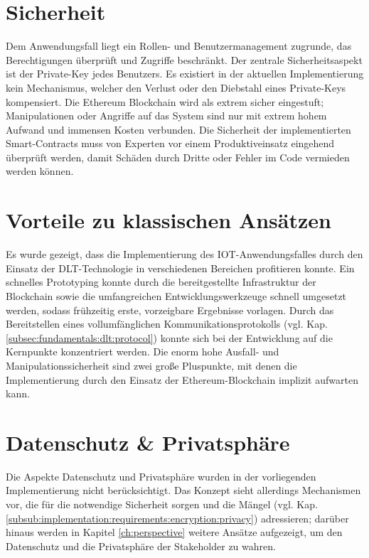 \section{Sicherheit}
\label{sec:results:Security}
Dem Anwendungsfall liegt ein Rollen- und Benutzermanagement zugrunde, das Berechtigungen überprüft und Zugriffe beschränkt. Der zentrale Sicherheitsaspekt ist der Private-Key jedes Benutzers. Es existiert in der aktuellen Implementierung kein Mechanismus, welcher den Verlust oder den Diebstahl eines Private-Keys kompensiert. Die Ethereum Blockchain wird als extrem sicher eingestuft; Manipulationen oder Angriffe auf das System sind nur mit extrem hohem Aufwand und immensen Kosten verbunden. Die Sicherheit der implementierten Smart-Contracts muss von Experten vor einem Produktiveinsatz eingehend überprüft werden, damit Schäden durch Dritte oder Fehler im Code vermieden werden können.

\section{Vorteile zu klassischen Ansätzen}
\label{sec:results:advantages}
Es wurde gezeigt, dass die Implementierung des \ac{IOT}-Anwendungsfalles durch den Einsatz der \ac{DLT}-Technologie in verschiedenen Bereichen profitieren konnte. Ein schnelles Prototyping konnte durch die bereitgestellte Infrastruktur der Blockchain sowie die umfangreichen Entwicklungswerkzeuge schnell umgesetzt werden, sodass frühzeitig erste, vorzeigbare Ergebnisse vorlagen. Durch das Bereitstellen eines vollumfänglichen Kommunikationsprotokolls (vgl. Kap. \ref{subsec:fundamentals:dlt:protocol}) konnte sich bei der Entwicklung auf die Kernpunkte konzentriert werden. Die enorm hohe Ausfall- und Manipulationssicherheit sind zwei große Pluspunkte, mit denen die Implementierung durch den Einsatz der Ethereum-Blockchain implizit aufwarten kann.

\section{Datenschutz \& Privatsphäre}
\label{sec:results:privacy}
Die Aspekte Datenschutz und Privatsphäre wurden in der vorliegenden Implementierung nicht berücksichtigt. Das Konzept sieht allerdings Mechanismen vor, die für die notwendige Sicherheit sorgen und die Mängel (vgl. Kap. \ref{subsub:implementation:requirements:encryption:privacy}) adressieren; darüber hinaus werden in Kapitel \ref{ch:perspective} weitere Ansätze aufgezeigt, um den Datenschutz und die Privatsphäre der Stakeholder zu wahren.

